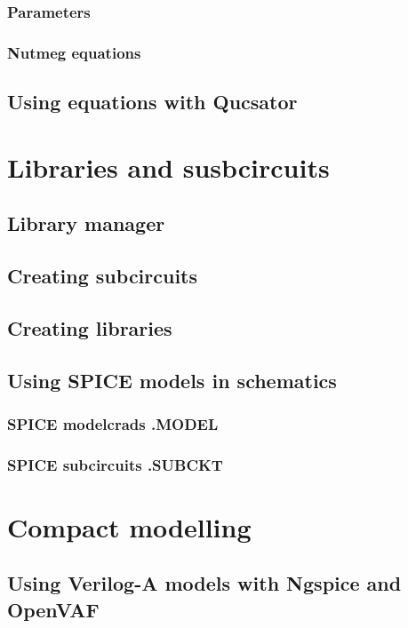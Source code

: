 \documentclass[a4paper,12pt]{article}
\begin{document}
\subsubsection{Parameters}

\subsubsection{Nutmeg equations}

\subsection{Using equations with Qucsator}

\section{Libraries and susbcircuits}

\subsection{Library manager}

\subsection{Creating subcircuits}

\subsection{Creating libraries}

\subsection{Using SPICE models in schematics}

\subsubsection{SPICE modelcrads .MODEL}

\subsubsection{SPICE subcircuits .SUBCKT}

\section{Compact modelling}

\subsection{Using Verilog-A models with Ngspice and OpenVAF}


	
% 
% 
\end{document}
